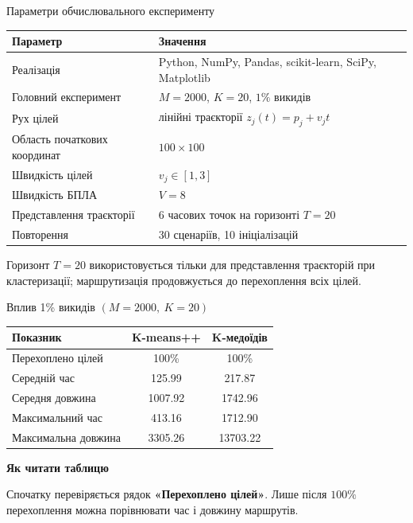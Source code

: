 \documentclass[aspectratio=169,11pt]{beamer}
\newcommand{\heading}[1]{{\usebeamercolor[fg]{structure}\bfseries #1}\par\smallskip}
\begin{document}
\begin{frame}{Параметри обчислювального експерименту}
    \small
    \begin{center}
    \begin{tabular}{p{}p{}}
        \toprule
        \textbf{Параметр} & \textbf{Значення} \\
        \midrule
        Реалізація & Python, NumPy, Pandas, scikit-learn, SciPy, Matplotlib \\
        \midrule
        Головний експеримент & $M=2000$, $K=20$, $1\%$ викидів \\
        \midrule
        Рух цілей & лінійні траєкторії $z_j(t)=p_j+v_jt$ \\
        \midrule
        Область початкових координат & $100\times100$ \\
        \midrule
        Швидкість цілей & $v_j\in[1,3]$ \\
        \midrule
        Швидкість БПЛА & $V=8$ \\
        \midrule
        Представлення траєкторії & 6 часових точок на горизонті $T=20$ \\
        \midrule
        Повторення & 30 сценаріїв, 10 ініціалізацій \\
        \bottomrule
    \end{tabular}
    \end{center}

    \medskip
    \footnotesize
    Горизонт $T=20$ використовується тільки для представлення траєкторій при кластеризації; маршрутизація продовжується до перехоплення всіх цілей.
\end{frame}

\begin{frame}{Вплив 1\% викидів $(M=2000,\ K=20)$}
    \small
    \begin{center}
    \begin{tabular}{lcc}
        \toprule
        \textbf{Показник} & \textbf{K-means++} & \textbf{K-медоїдів} \\
        \midrule
        Перехоплено цілей & 100\% & 100\% \\
        Середній час & 125.99 & 217.87 \\
        Середня довжина & 1007.92 & 1742.96 \\
        Максимальний час & 413.16 & 1712.90 \\
        Максимальна довжина & 3305.26 & 13703.22 \\
        \bottomrule
    \end{tabular}
    \end{center}

    \bigskip
    \heading{Як читати таблицю}
    Спочатку перевіряється рядок \textbf{«Перехоплено цілей»}. Лише після $100\%$ перехоплення можна порівнювати час і довжину маршрутів.
\end{frame}
\end{document}
